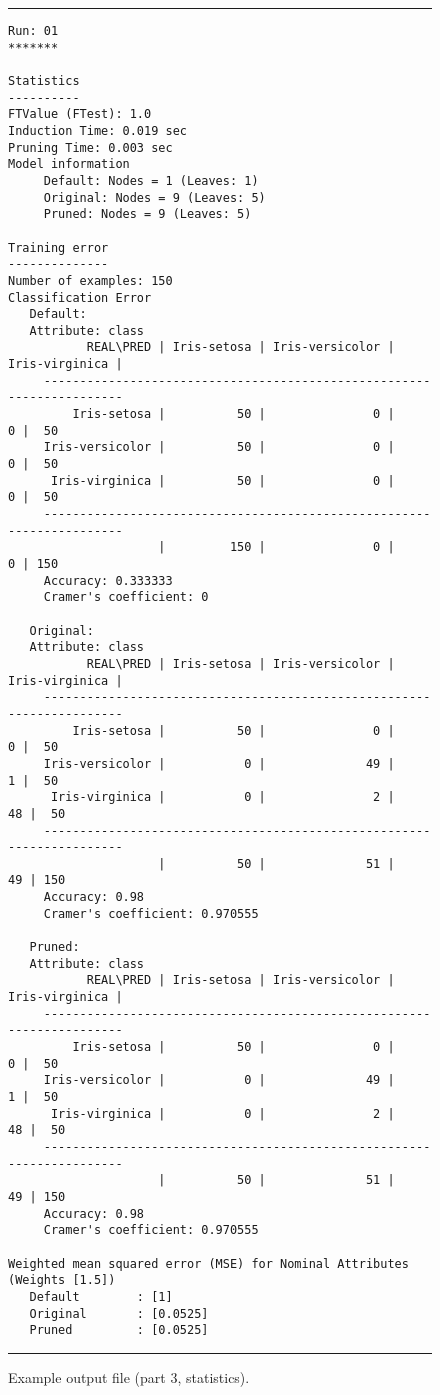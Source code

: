\begin{figure}
\hrule
\footnotesize
\begin{verbatim}
Run: 01
*******

Statistics
----------
FTValue (FTest): 1.0
Induction Time: 0.019 sec
Pruning Time: 0.003 sec
Model information
     Default: Nodes = 1 (Leaves: 1)
     Original: Nodes = 9 (Leaves: 5)
     Pruned: Nodes = 9 (Leaves: 5)

Training error
--------------
Number of examples: 150
Classification Error
   Default: 
   Attribute: class
           REAL\PRED | Iris-setosa | Iris-versicolor | Iris-virginica |
     ----------------------------------------------------------------------
         Iris-setosa |          50 |               0 |              0 |  50
     Iris-versicolor |          50 |               0 |              0 |  50
      Iris-virginica |          50 |               0 |              0 |  50
     ----------------------------------------------------------------------
                     |         150 |               0 |              0 | 150
     Accuracy: 0.333333
     Cramer's coefficient: 0

   Original: 
   Attribute: class
           REAL\PRED | Iris-setosa | Iris-versicolor | Iris-virginica |
     ----------------------------------------------------------------------
         Iris-setosa |          50 |               0 |              0 |  50
     Iris-versicolor |           0 |              49 |              1 |  50
      Iris-virginica |           0 |               2 |             48 |  50
     ----------------------------------------------------------------------
                     |          50 |              51 |             49 | 150
     Accuracy: 0.98
     Cramer's coefficient: 0.970555

   Pruned: 
   Attribute: class
           REAL\PRED | Iris-setosa | Iris-versicolor | Iris-virginica |
     ----------------------------------------------------------------------
         Iris-setosa |          50 |               0 |              0 |  50
     Iris-versicolor |           0 |              49 |              1 |  50
      Iris-virginica |           0 |               2 |             48 |  50
     ----------------------------------------------------------------------
                     |          50 |              51 |             49 | 150
     Accuracy: 0.98
     Cramer's coefficient: 0.970555

Weighted mean squared error (MSE) for Nominal Attributes (Weights [1.5])
   Default        : [1]
   Original       : [0.0525]
   Pruned         : [0.0525]
\end{verbatim}
\hrule
\caption{Example output file (part 3, statistics).}
\label{output3:fig}
\end{figure}

